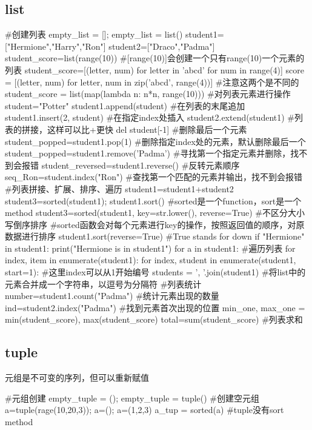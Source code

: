 \documentclass{article}
\begin{document}
    \subsection{list}
      \begin{codeblock}[language=python, caption={basic operations of list}]
        #创建列表
        empty_list = []; empty_list = list()
        student1=["Hermione","Harry","Ron"]
        student2=["Draco","Padma"]
        student_score=list(range(10)) #[range(10)]会创建一个只有range(10)一个元素的列表
        student_score=[(letter, num) for letter in 'abcd' for num in range(4)]
        score = [(letter, num) for letter, num in zip('abcd', range(4))] #注意这两个是不同的
        student_score = list(map(lambda n: n*n, range(10)))
        #对列表元素进行操作
        student="Potter"
        student1.append(student) #在列表的末尾追加
        student1.insert(2, student) #在指定index处插入
        student2.extend(student1) #列表的拼接，这样可以比+更快
        del student[-1] #删除最后一个元素
        student_popped=student1.pop(1) #删除指定index处的元素，默认删除最后一个
        student_popped=student1.remove('Padma') #寻找第一个指定元素并删除，找不到会报错
        student_reversed=student1.reverse() #反转元素顺序
        seq_Ron=student.index("Ron") #查找第一个匹配的元素并输出，找不到会报错
        #列表拼接、扩展、排序、遍历
        student1=student1+student2
        student3=sorted(student1); student1.sort() #sorted是一个function，sort是一个method
        student3=sorted(student1, key=str.lower(), reverse=True) #不区分大小写倒序排序
        #sorted函数会对每个元素进行key的操作，按照返回值的顺序，对原数据进行排序
        student1.sort(reverse=True) #True stands for down
        if "Hermione" in student1:
          print("Hermione is in student1")
        for a in student1: #遍历列表
        for index, item in enumerate(student1):
        for index, student in enumerate(student1, start=1): #这里index可以从1开始编号
        students = ', '.join(student1) #将list中的元素合并成一个字符串，以逗号为分隔符
        #列表统计
        number=student1.count("Padma") #统计元素出现的数量
        ind=student2.index("Padma") #找到元素首次出现的位置
        min_one, max_one = min(student_score), max(student_score)
        total=sum(student_score) #列表求和
      \end{codeblock}

    \subsection{tuple}
      元组是不可变的序列，但可以重新赋值
      \begin{codeblock}[language=python, caption={basic operation of tuple}]
        #元组创建
        empty_tuple = (); empty_tuple = tuple() #创建空元组
        a=tuple(rage(10,20,3)); a=(); a=(1,2,3)
        a_tup = sorted(a) #tuple没有sort method
      \end{codeblock}
\end{document}
